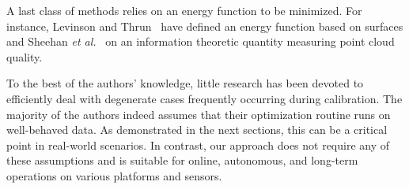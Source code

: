 A last class of methods relies on an energy function to be minimized. For
instance, Levinson and Thrun~\cite{levinson10unsupervised} have defined an
energy function based on surfaces and Sheehan \emph{et al.}~\cite{sheehan12self}
on an information theoretic quantity measuring point cloud quality.

To the best of the authors' knowledge, little research has been devoted to
efficiently deal with degenerate cases frequently occurring during calibration.
The majority of the authors indeed assumes that their optimization routine runs
on well-behaved data. As demonstrated in the next sections, this can be a
critical point in real-world scenarios. In contrast, our approach does not
require any of these assumptions and is suitable for online, autonomous, and
long-term operations on various platforms and sensors.
